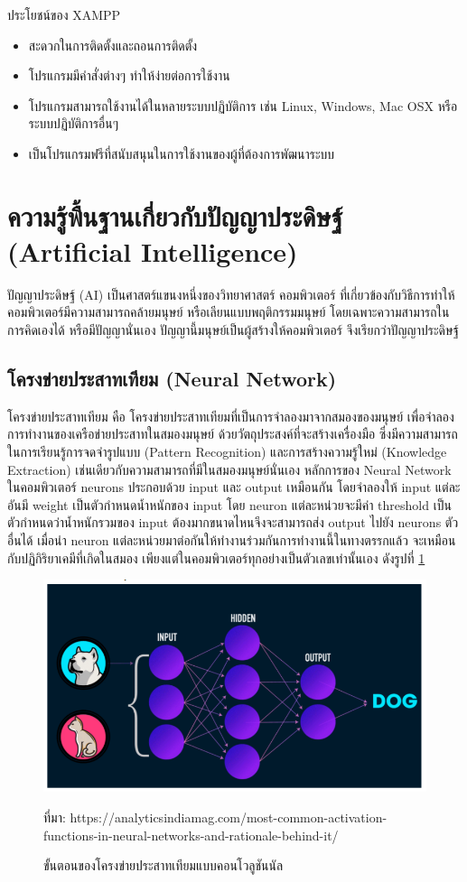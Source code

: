 		ประโยชน์ของ XAMPP
		\begin{itemize}
			\item สะดวกในการติดตั้งและถอนการติดตั้ง
			\item โปรแกรมมีคำสั่งต่างๆ ทำให้ง่ายต่อการใช้งาน
			\item โปรแกรมสามารถใช้งานได้ในหลายระบบปฏิบัติการ เช่น  Linux, Windows, Mac OSX หรือ ระบบปฏิบัติการอื่นๆ
			\item เป็นโปรแกรมฟรีที่สนับสนุนในการใช้งานของผู้ที่ต้องการพัฒนาระบบ 
		\end{itemize}
		
			
			\section{ความรู้พื้นฐานเกี่ยวกับปัญญาประดิษฐ์ (Artificial Intelligence)}
			ปัญญาประดิษฐ์ (AI) เป็นศาสตร์แขนงหนึ่งของวิทยาศาสตร์ คอมพิวเตอร์ ที่เกี่ยวข้องกับวิธีการทำให้คอมพิวเตอร์มีความสามารถคล้ายมนุษย์ หรือเลียนแบบพฤติกรรมมนุษย์ โดยเฉพาะความสามารถในการคิดเองได้ หรือมีปัญญานั่นเอง ปัญญานี้มนุษย์เป็นผู้สร้างให้คอมพิวเตอร์ จึงเรียกว่าปัญญาประดิษฐ์  
			
			\subsection{โครงข่ายประสาทเทียม (Neural Network) }
			โครงข่ายประสาทเทียม  คือ โครงข่ายประสาทเทียมที่เป็นการจำลองมาจากสมองของมนุษย์ เพื่อจำลองการทำงานของเครือข่ายประสาทในสมองมนุษย์ ด้วยวัตถุประสงค์ที่จะสร้างเครื่องมือ ซึ่งมีความสามารถในการเรียนรู้การจดจำรูปแบบ (Pattern Recognition) และการสร้างความรู้ใหม่ (Knowledge Extraction) เช่นเดียวกับความสามารถที่มีในสมองมนุษย์นั่นเอง
			หลักการของ Neural Network 
			ในคอมพิวเตอร์ neurons ประกอบด้วย input และ output เหมือนกัน โดยจำลองให้ input แต่ละอันมี weight เป็นตัวกำหนดน้ำหนักของ input โดย neuron แต่ละหน่วยจะมีค่า threshold เป็นตัวกำหนดว่าน้ำหนักรวมของ input ต้องมากขนาดไหนจึงจะสามารถส่ง output ไปยัง neurons ตัวอื่นได้ เมื่อนำ neuron แต่ละหน่วยมาต่อกันให้ทำงานร่วมกันการทำงานนี้ในทางตรรกแล้ว จะเหมือนกับปฏิกิริยาเคมีที่เกิดในสมอง เพียงแต่ในคอมพิวเตอร์ทุกอย่างเป็นตัวเลขเท่านั้นเอง ดังรูปที่ \ref{Fig:CNN}
			\begin{figure}[H]
				\includegraphics[width=\columnwidth]{Figures/insect2/NN}
				\caption{ขั้นตอนของโครงข่ายประสาทเทียมแบบคอนโวลูชันนัล}{ที่มา: https://analyticsindiamag.com/most-common-activation-functions-in-neural-networks-and-rationale-behind-it/}
				\label{Fig:CNN} 
			\end{figure}

